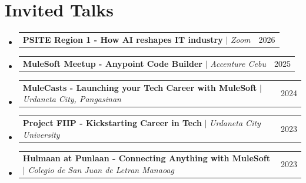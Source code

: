 \documentclass[a4paper,11pt]{article}
\makeatletter
\newcommand{\resumeProjectHeading}[2]{
    \item
    \begin{tabular*}{0.97\textwidth}{l@{\extracolsep{\fill}}r}
      \small#1 & #2 \\
    \end{tabular*}\vspace{-7pt}
}
\newcommand{\resumeSubHeadingListStart}{\begin{itemize}[leftmargin=0.15in, label={}]}
\newcommand{\resumeSubHeadingListEnd}{\end{itemize}}
\makeatother
\begin{document}
\section{Invited Talks}
\resumeSubHeadingListStart
\resumeProjectHeading
{\textbf{PSITE Region 1 - How AI reshapes IT industry} $|$ \emph{Zoom}}{2026}
\resumeProjectHeading
{\textbf{MuleSoft Meetup - Anypoint Code Builder} $|$ \emph{Accenture Cebu}}{2025}
\resumeProjectHeading
{\textbf{MuleCasts - Launching your Tech Career with MuleSoft} $|$ \emph{Urdaneta City, Pangasinan}}{2024}
\resumeProjectHeading
{\textbf{Project FIIP - Kickstarting Career in Tech} $|$ \emph{Urdaneta City University}}{2023}
\resumeProjectHeading
{\textbf{Hulmaan at Punlaan - Connecting Anything with MuleSoft} $|$ \emph{Colegio de San Juan de Letran Manaoag}}{2023}
\resumeSubHeadingListEnd

\end{document}
